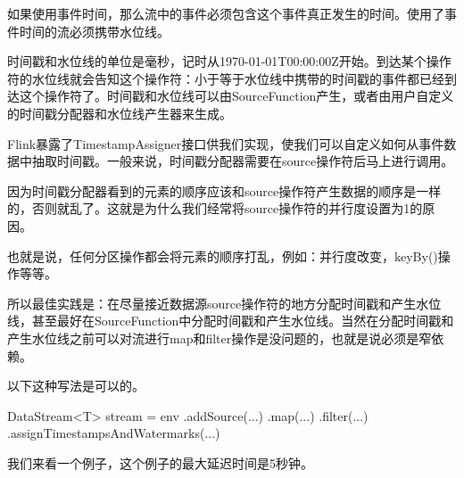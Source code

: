 \documentclass[cn,11pt,chinese]{elegantbook}
\newenvironment{Shaded}{}{}
\newcommand{\FunctionTok}[1]{\textcolor[rgb]{0.02,0.16,0.49}{#1}}
\newcommand{\NormalTok}[1]{#1}
\renewenvironment{quote}{\begin{customblockquote}\list{}{\rightmargin=0em\leftmargin=0em}%
\item\relax\color{blockquote-text}\ignorespaces}{\unskip\unskip\endlist\end{customblockquote}}
\begin{document}
如果使用事件时间，那么流中的事件必须包含这个事件真正发生的时间。使用了事件时间的流必须携带水位线。

时间戳和水位线的单位是毫秒，记时从1970-01-01T00:00:00Z开始。到达某个操作符的水位线就会告知这个操作符：小于等于水位线中携带的时间戳的事件都已经到达这个操作符了。时间戳和水位线可以由SourceFunction产生，或者由用户自定义的时间戳分配器和水位线产生器来生成。

Flink暴露了TimestampAssigner接口供我们实现，使我们可以自定义如何从事件数据中抽取时间戳。一般来说，时间戳分配器需要在source操作符后马上进行调用。

\begin{quote}
因为时间戳分配器看到的元素的顺序应该和source操作符产生数据的顺序是一样的，否则就乱了。这就是为什么我们经常将source操作符的并行度设置为1的原因。
\end{quote}

也就是说，任何分区操作都会将元素的顺序打乱，例如：并行度改变，keyBy()操作等等。

所以最佳实践是：在尽量接近数据源source操作符的地方分配时间戳和产生水位线，甚至最好在SourceFunction中分配时间戳和产生水位线。当然在分配时间戳和产生水位线之前可以对流进行map和filter操作是没问题的，也就是说必须是窄依赖。

以下这种写法是可以的。

\begin{Shaded}
\begin{Highlighting}[]
\NormalTok{DataStream\textless{}T\textgreater{} stream = env}
\NormalTok{  .}\FunctionTok{addSource}\NormalTok{(...)}
\NormalTok{  .}\FunctionTok{map}\NormalTok{(...)}
\NormalTok{  .}\FunctionTok{filter}\NormalTok{(...)}
\NormalTok{  .}\FunctionTok{assignTimestampsAndWatermarks}\NormalTok{(...)}
\end{Highlighting}
\end{Shaded}

我们来看一个例子，这个例子的最大延迟时间是5秒钟。
\end{document}
